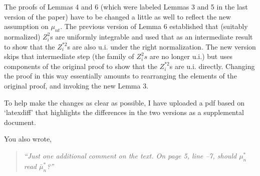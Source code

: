 \documentclass[12pt]{article}
\begin{document}
The proofs of Lemmas 4 and 6 (which were labeled Lemmas 3 and 5 in the
last version of the paper) have to be changed a little as well to
reflect the new assumption on $\mu_{nt}$. The previous version of
Lemma 6 established that (suitably normalized) $Z_i^2$s are uniformly
integrable and used that as an intermediate result to show that the
$Z_i^{*2}$s are also u.i. under the right normalization. The new
version skips that intermediate step (the family of $Z_i^2s$ are no
longer u.i.) but uses components of the original proof to show that
the $Z_i^{*2}$s are u.i. directly. Changing the proof in this way
essentially amounts to rearranging the elements of the original proof,
and invoking the new Lemma 3.

To help make the changes as clear as possible, I have uploaded a
pdf based on `latexdiff' that highlights the differences in the
two versions as a supplemental document.

You also wrote,
\begin{quotation}
  \noindent\textit{``Just one additional comment on the text. On page
    5, line --7, should $\mu_n^*$ read $\bar{\mu}_n^*$?''}
\end{quotation}
\end{document}
